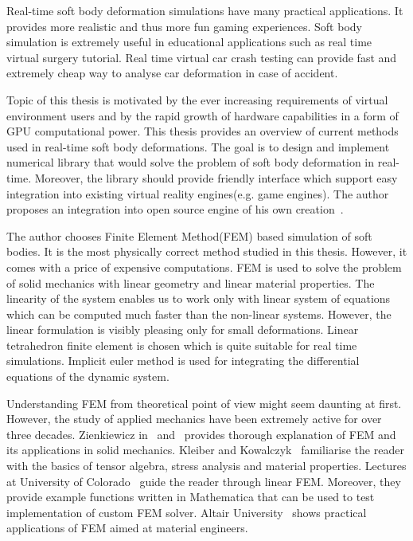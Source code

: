 \documentclass[en]{minipw} %
\begin{document}
Real-time soft body deformation simulations have many practical applications. It provides more realistic and thus more fun gaming experiences. Soft body simulation is extremely useful in educational applications such as real time virtual surgery tutorial. Real time virtual car crash testing can provide fast and extremely cheap way to analyse car deformation in case of accident.

Topic of this thesis is motivated by the ever increasing requirements of virtual environment users and by the rapid growth of hardware capabilities in a form of GPU computational power. This thesis provides an overview of current methods used in real-time soft body deformations. The goal is to design and implement numerical library that would solve the problem of soft body deformation in real-time. Moreover, the library should provide friendly interface which support easy integration into existing virtual reality engines(e.g. game engines). The author proposes an integration into open source engine of his own creation~\cite{ifx}.

The author chooses Finite Element Method(FEM) based simulation of soft bodies. It is the most physically correct method studied in this thesis. However, it comes with a price of expensive computations. FEM is used to solve the problem of solid mechanics with linear geometry and linear material properties. The linearity of the system enables us to work only with linear system of equations which can be computed much faster than the non-linear systems. However, the linear formulation is visibly pleasing only for small deformations. Linear tetrahedron finite element is chosen which is quite suitable for real time simulations. Implicit euler method is used for integrating the differential equations of the dynamic system.

Understanding FEM from theoretical point of view might seem daunting at first. However, the study of applied mechanics have been extremely active for over three decades. Zienkiewicz in~\cite{zienkiewicz1} and~\cite{zienkiewicz2} provides thorough explanation of FEM and its applications in solid mechanics. Kleiber and Kowalczyk~\cite{termo} familiarise the reader with the basics of tensor algebra, stress analysis and material properties. Lectures at University of Colorado~\cite{colorado_fem_lectures} guide the reader through linear FEM. Moreover, they provide example functions written in Mathematica that can be used to test implementation of custom FEM solver. Altair University~\cite{altair} shows practical applications of FEM aimed at material engineers.
\end{document}
